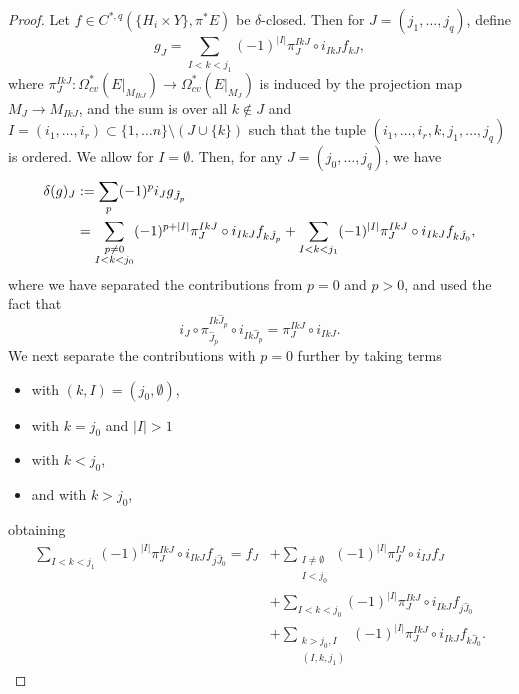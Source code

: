 \documentclass[11pt,psamsfonts, oneside, reqno]{amsart}
\newcommand{\cl}{\colon}
\theoremstyle{definition}
\theoremstyle{remark}
\numberwithin{equation}{section}
\begin{document}
\begin{proof}
	Let $f \in C^{*,q}(\{H_i \times Y\}, \pi^*E)$ be $\delta$-closed. Then for $J = (j_1, \dots, j_q)$, define
	\begin{equation*}
		g_{J} = \sum_{I<k<j_1} (-1)^{|I|}\pi_{J}^{IkJ} \circ i_{IkJ} f_{kJ},
	\end{equation*}
	where $\pi_{J}^{IkJ}\cl \Omega^*_{cv}(E|_{M_{IkJ}}) \rightarrow \Omega^*_{cv}(E|_{M_{J}})$ is induced by the projection map $M_{J} \rightarrow M_{IkJ}$, and the sum is over all $k \notin J$ and $I = (i_1, \dots, i_r) \subset \{1, \dots n\} \setminus (J \cup \{k\})$ such that the tuple $(i_1, \dots, i_r, k, j_1, \dots, j_q)$ is ordered. We allow for $I =  \emptyset$. Then, for any $J = (j_0, \dots, j_q)$, we have 
	\begin{align}	\label{eq:terms with p>0}
		\notag\delta(g)_{J} &:= \sum_p (-1)^p i_{J} g_{\hat{J}_p}\\
		&= \sum_{\substack{p \neq 0\\I < k < j_0}} (-1)^{p+|I|} \pi_{J}^{IkJ} \circ i_{IkJ} f_{k\hat{J}_p}+ \sum_{I < k < j_1} (-1)^{|I|} \pi_{J}^{IkJ} \circ i_{IkJ} f_{k\hat{J}_0},
	\end{align}
	where we have separated the contributions from $p=0$ and $p >0$, and used the fact that 
	$$i_{J} \circ \pi_{\hat{J}_p}^{Ik \hat{J}_p} \circ i_{Ik \hat{J}_p} = \pi_{J}^{IkJ} \circ i_{Ik J}.$$ 
	We next separate the contributions with $p=0$ further by taking terms 
	\begin{itemize}
		\item with $(k,I) = (j_0, \emptyset)$,
		\item with $k = j_0$ and $|I| >1$
		\item with $k < j_0$,
		\item and with $k>j_0$,
	\end{itemize} 
	obtaining
	\begin{align}
		\sum_{I < k < j_1} (-1)^{|I|} \pi_{J}^{IkJ} \circ i_{IkJ} f_{j \hat{J}_0} = f_J
		&+\sum_{\substack{I\neq \emptyset\\I < j_0}} (-1)^{|I|} \pi_{J}^{IJ} \circ i_{IJ} f_{J} 
		\label{eq:terms with I nonempty and k = j0}\\
		&+\sum_{I < k < j_0} (-1)^{|I|} \pi_{J}^{IkJ} \circ i_{IkJ} f_{j \hat{J}_0}
		\label{eq:terms with k < j0}\\
		&+\sum_{\substack{k > j_0, I\\(I,k,j_1)}} (-1)^{|I|} \pi_{J}^{IkJ} \circ i_{IkJ}f_{k\hat{J}_0}.
		\label{eq:terms with k > j0}
	\end{align}

\end{proof}
\end{document}
